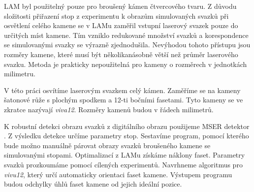 LAM byl použitelný pouze pro broušený kámen čtvercového tvaru. Z důvodu složitosti přiřazení stop z experimentu k obrazům simulovaných svazků při osvětlení celého kamene se v LAMu zaměřil  vstupní laserový svazek pouze do určitých míst kamene. Tím vzniklo redukované množství svazků a korespondence se simulovanými svazky se výrazně zjednodušila. Nevýhodou tohoto přístupu jsou rozměry kamene, které musí být několikanásobně větší než průměr laserového svazku. Metoda je prakticky nepoužitelná pro kameny o rozměrech v jednotkách milimetru. 

	V této práci osvítíme laserovým svazkem celý kámen. Zaměříme se na kameny šatonové růže s plochým spodkem a 12-ti bočními fasetami. Tyto kameny se ve zkratce nazývají \textit{viva12}. Rozměry kamenů budou v řádech milimetrů. 
	
	K robustní detekci obrazu svazků z digitálního obrazu použijeme MSER detektor \cite{Matas}. Z výsledku detekce určíme parametry stop. Sestavíme program, pomocí kterého bude možno manuálně párovat obrazy svazků broušeného kamene se simulovanými stopami.
 Optimalizací z LAMu získáme náklony faset. Parametry svazků prozkoumáme pomocí cílených experimentů. Navrhneme algoritmus pro \textit{vivu12}, který určí automaticky orientaci faset kamene. Výstupem programu budou odchylky úhlů faset kamene od jejich ideální pozice.

















